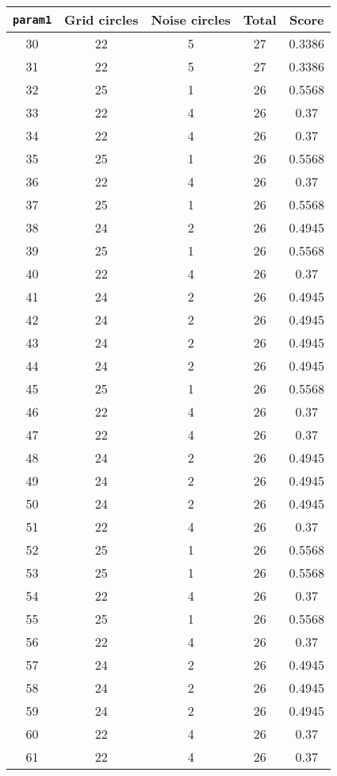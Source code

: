 \documentclass[letterpaper, 12pt]{article}
\begin{document}
\begin{longtable}{|c|c|c|c|c|}
\hline
\textbf{\texttt{param1}} & \textbf{Grid circles} & \textbf{Noise circles} & \textbf{Total} & \textbf{Score} \\
\hline
30 & 22 & 5 & 27 & 0.3386 \\
\hline
31 & 22 & 5 & 27 & 0.3386 \\
\hline
32 & 25 & 1 & 26 & 0.5568 \\
\hline
33 & 22 & 4 & 26 & 0.37 \\
\hline
34 & 22 & 4 & 26 & 0.37 \\
\hline
35 & 25 & 1 & 26 & 0.5568 \\
\hline
36 & 22 & 4 & 26 & 0.37 \\
\hline
37 & 25 & 1 & 26 & 0.5568 \\
\hline
38 & 24 & 2 & 26 & 0.4945 \\
\hline
39 & 25 & 1 & 26 & 0.5568 \\
\hline
40 & 22 & 4 & 26 & 0.37 \\
\hline
41 & 24 & 2 & 26 & 0.4945 \\
\hline
42 & 24 & 2 & 26 & 0.4945 \\
\hline
43 & 24 & 2 & 26 & 0.4945 \\
\hline
44 & 24 & 2 & 26 & 0.4945 \\
\hline
45 & 25 & 1 & 26 & 0.5568 \\
\hline
46 & 22 & 4 & 26 & 0.37 \\
\hline
47 & 22 & 4 & 26 & 0.37 \\
\hline
48 & 24 & 2 & 26 & 0.4945 \\
\hline
49 & 24 & 2 & 26 & 0.4945 \\
\hline
50 & 24 & 2 & 26 & 0.4945 \\
\hline
51 & 22 & 4 & 26 & 0.37 \\
\hline
52 & 25 & 1 & 26 & 0.5568 \\
\hline
53 & 25 & 1 & 26 & 0.5568 \\
\hline
54 & 22 & 4 & 26 & 0.37 \\
\hline
55 & 25 & 1 & 26 & 0.5568 \\
\hline
56 & 22 & 4 & 26 & 0.37 \\
\hline
57 & 24 & 2 & 26 & 0.4945 \\
\hline
58 & 24 & 2 & 26 & 0.4945 \\
\hline
59 & 24 & 2 & 26 & 0.4945 \\
\hline
60 & 22 & 4 & 26 & 0.37 \\
\hline
61 & 22 & 4 & 26 & 0.37 \\

\end{longtable}
\end{document}
